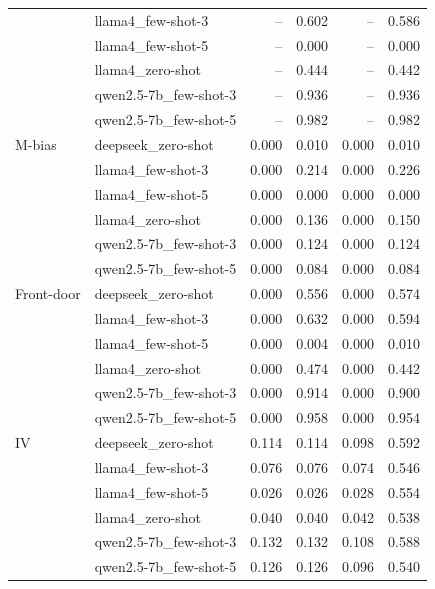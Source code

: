 \begin{table}[t]
\begin{tabular}{llrrrr}
 & llama4\_few-shot-3 & -- & 0.602 & -- & 0.586 \\
 & llama4\_few-shot-5 & -- & 0.000 & -- & 0.000 \\
 & llama4\_zero-shot & -- & 0.444 & -- & 0.442 \\
 & qwen2.5-7b\_few-shot-3 & -- & 0.936 & -- & 0.936 \\
 & qwen2.5-7b\_few-shot-5 & -- & 0.982 & -- & 0.982 \\
\midrule
M-bias & deepseek\_zero-shot & 0.000 & 0.010 & 0.000 & 0.010 \\
 & llama4\_few-shot-3 & 0.000 & 0.214 & 0.000 & 0.226 \\
 & llama4\_few-shot-5 & 0.000 & 0.000 & 0.000 & 0.000 \\
 & llama4\_zero-shot & 0.000 & 0.136 & 0.000 & 0.150 \\
 & qwen2.5-7b\_few-shot-3 & 0.000 & 0.124 & 0.000 & 0.124 \\
 & qwen2.5-7b\_few-shot-5 & 0.000 & 0.084 & 0.000 & 0.084 \\
\midrule
Front-door & deepseek\_zero-shot & 0.000 & 0.556 & 0.000 & 0.574 \\
 & llama4\_few-shot-3 & 0.000 & 0.632 & 0.000 & 0.594 \\
 & llama4\_few-shot-5 & 0.000 & 0.004 & 0.000 & 0.010 \\
 & llama4\_zero-shot & 0.000 & 0.474 & 0.000 & 0.442 \\
 & qwen2.5-7b\_few-shot-3 & 0.000 & 0.914 & 0.000 & 0.900 \\
 & qwen2.5-7b\_few-shot-5 & 0.000 & 0.958 & 0.000 & 0.954 \\
\midrule
IV & deepseek\_zero-shot & 0.114 & 0.114 & 0.098 & 0.592 \\
 & llama4\_few-shot-3 & 0.076 & 0.076 & 0.074 & 0.546 \\
 & llama4\_few-shot-5 & 0.026 & 0.026 & 0.028 & 0.554 \\
 & llama4\_zero-shot & 0.040 & 0.040 & 0.042 & 0.538 \\
 & qwen2.5-7b\_few-shot-3 & 0.132 & 0.132 & 0.108 & 0.588 \\
 & qwen2.5-7b\_few-shot-5 & 0.126 & 0.126 & 0.096 & 0.540 \\
\bottomrule
\end{tabular}
\end{table}
